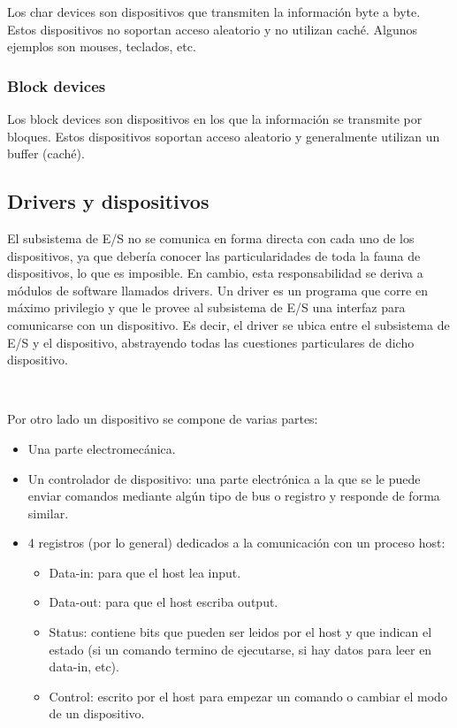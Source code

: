\documentclass{article}
\begin{document}
Los char devices son dispositivos que transmiten la informaci\'on byte a byte. Estos dispositivos no soportan acceso aleatorio y no utilizan cach\'e. Algunos ejemplos son mouses, teclados, etc.

\subsubsection{Block devices}

Los block devices son dispositivos en los que la informaci\'on se transmite por bloques. Estos dispositivos soportan acceso aleatorio y generalmente utilizan un buffer (cach\'e).

\subsection{Drivers y dispositivos}

El subsistema de E/S no se comunica en forma directa con cada uno de los dispositivos, ya que debería conocer las particularidades de toda la fauna de dispositivos, lo que es imposible. En cambio, esta responsabilidad se deriva a módulos de software llamados drivers. Un driver es un programa que corre en máximo privilegio y que le provee al subsistema de E/S una interfaz para comunicarse con un dispositivo. Es decir, el driver se ubica entre el subsistema de E/S y el dispositivo, abstrayendo todas las cuestiones particulares de dicho dispositivo.

~

Por otro lado un dispositivo se compone de varias partes:

\begin{itemize}
 \item Una parte electromecánica.
 \item Un controlador de dispositivo: una parte electrónica a la que se le puede enviar comandos mediante algún tipo de bus o registro y responde de forma similar.
 \item 4 registros (por lo general) dedicados a la comunicación con un proceso host:
 \begin{itemize}
  \item Data-in: para que el host lea input.
  \item Data-out: para que el host escriba output.
  \item Status: contiene bits que pueden ser leidos por el host y que indican el estado (si un comando termino de ejecutarse, si hay datos para leer en data-in, etc).
  \item Control: escrito por el host para empezar un comando o cambiar el modo de un dispositivo.
 \end{itemize}

\end{itemize}
\end{document}
